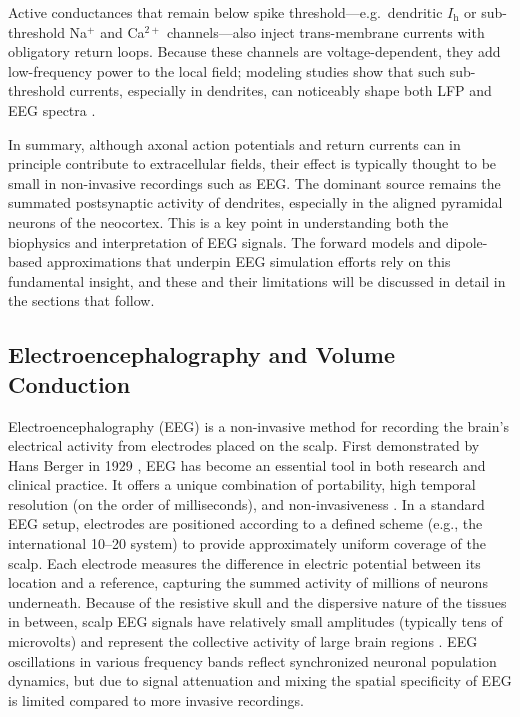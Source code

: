 \documentclass[final, a4paper,masters,en,listoffigures,listoftables,norwegiandates]{NMBU}
\begin{document}
Active conductances that remain below spike threshold—e.g.\ dendritic $I_{\mathrm h}$ or sub-threshold Na$^{+}$ and Ca$^{2+}$ channels—also inject trans-membrane currents with obligatory return loops.  Because these channels are voltage-dependent, they add low-frequency power to the local field; modeling studies show that such sub-threshold currents, especially in dendrites, can noticeably shape both LFP and EEG spectra \cite{ness2016subthreshold, Ness2018}.

In summary, although axonal action potentials and return currents can in principle contribute to extracellular fields, their effect is typically thought to be small in non-invasive recordings such as EEG. The dominant source remains the summated postsynaptic activity of dendrites, especially in the aligned pyramidal neurons of the neocortex. This is a key point in understanding both the biophysics and interpretation of EEG signals. The forward models and dipole-based approximations that underpin EEG simulation efforts rely on this fundamental insight, and these and their limitations will be discussed in detail in the sections that follow.


\subsection{Electroencephalography and Volume Conduction}

Electroencephalography (EEG) is a non-invasive method for recording the brain’s electrical activity from electrodes placed on the scalp. First demonstrated by Hans Berger in 1929 \cite{berger1929elektroenkephalogramm}, EEG has become an essential tool in both research and clinical practice. It offers a unique combination of portability, high temporal resolution (on the order of milliseconds), and non-invasiveness \cite{kandel2021principles}. In a standard EEG setup, electrodes are positioned according to a defined scheme (e.g., the international 10--20 system) to provide approximately uniform coverage of the scalp. Each electrode measures the difference in electric potential between its location and a reference, capturing the summed activity of millions of neurons underneath. Because of the resistive skull and the dispersive nature of the tissues in between, scalp EEG signals have relatively small amplitudes (typically tens of microvolts) and represent the collective activity of large brain regions \cite{BIASIUCCI2019R80}. EEG oscillations in various frequency bands reflect synchronized neuronal population dynamics, but due to signal attenuation and mixing the spatial specificity of EEG is limited compared to more invasive recordings.
\end{document}
